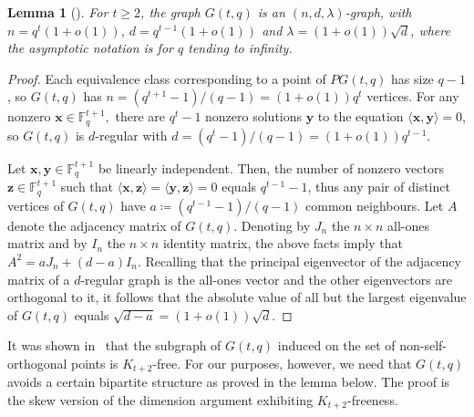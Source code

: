 \documentclass{article}
\theoremstyle{plain}
\newtheorem{lemma}[theorem]{Lemma}
\theoremstyle{definition}
\newcommand{\bF}{\mathbb{F}}
\newcommand{\bx}{\mathbf{x}}
\newcommand{\by}{\mathbf{y}}
\newcommand{\bz}{\mathbf{z}}
\begin{document}
\begin{lemma}[\cite{alon-krivelevich}] \label{lem:properties}
    For $t \ge 2$, the graph $G(t, q)$ is an $(n, d, \lambda)$-graph, with $n = q^t (1 + o(1))$, $d = q^{t-1}(1 + o(1))$ and $\lambda = (1+o(1)) \sqrt{d}$, where the asymptotic notation is for $q$ tending to infinity.
\end{lemma}
\begin{proof}
    Each equivalence class corresponding to a point of $PG(t, q)$ has size $q-1$, so $G(t,q)$ has $n = (q^{t+1} - 1) / (q-1) = (1+o(1)) q^t$ vertices. For any nonzero $\bx \in \bF_q^{t+1},$ there are $q^t - 1$ nonzero solutions $\by$ to the equation $\langle \bx, \by \rangle = 0$, so $G(t,q)$ is $d$-regular with $d = (q^t - 1) / (q-1) = (1+o(1))q^{t-1}.$

    Let $\bx, \by \in \bF_q^{t+1}$ be linearly independent. Then, the number of nonzero vectors $\bz \in \bF_q^{t+1}$ such that $\langle \bx, \bz \rangle = \langle \by, \bz \rangle = 0$ equals $q^{t-1} - 1$, thus any pair of distinct vertices of $G(t,q)$ have $a \coloneqq (q^{t-1} - 1) / (q-1)$ common neighbours. Let $A$ denote the adjacency matrix of $G(t, q)$. Denoting by $J_n$ the $n \times n$ all-ones matrix and by $I_n$ the $n \times n$ identity matrix, the above facts imply that $A^2 = aJ_n + (d-a)I_n.$ Recalling that the principal eigenvector of the adjacency matrix of a $d$-regular graph is the all-ones vector and the other eigenvectors are orthogonal to it, it follows that the absolute value of all but the largest eigenvalue of $G(t,q)$ equals $\sqrt{d-a} = (1+o(1)) \sqrt{d}.$
\end{proof}

It was shown in~\cite{alon-krivelevich} that the subgraph of $G(t, q)$ induced on the set of non-self-orthogonal points is $K_{t+2}$-free. For our purposes, however, we need that $G(t, q)$ avoids a certain bipartite structure as proved in the lemma below. The proof is the skew version of the dimension argument exhibiting $K_{t+2}$-freeness.
\end{document}
